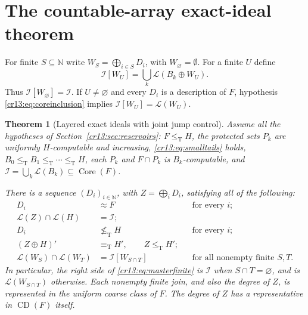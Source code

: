 \documentclass[11pt,letterpaper]{article}
\newtheorem{theorem}{Theorem}[section]
\theoremstyle{definition}
\theoremstyle{remark}\newtheorem{remark}[theorem]{Remark}
\numberwithin{equation}{section}
\newcommand{\N}{\mathbb N}
\newcommand{\leT}{\leq_{\mathrm T}}
\newcommand{\eqT}{\equiv_{\mathrm T}}
\newcommand{\nleT}{\nleq_{\mathrm T}}
\newcommand{\Low}{\mathcal L}
\newcommand{\Core}{\operatorname{Core}}
\newcommand{\CD}{\operatorname{CD}}
\newcommand{\Ideal}{\mathcal I}
\begin{document}
\section{The countable-array exact-ideal theorem}
\label{cr13:sec:master}
For finite $S\subseteq\N$ write $W_S=\bigoplus_{i\in S}D_i$, with $W_\varnothing=\emptyset$. For a finite $U$ define
\begin{equation}\label{cr13:eq:relativeideal}
                \Ideal[W_U]=\bigcup_k\Low(B_k\oplus W_U).
\end{equation}
Thus $\Ideal[W_\varnothing]=\Ideal$. If $U\ne\varnothing$ and every $D_i$ is a description of $F$, hypothesis \eqref{cr13:eq:coreinclusion} implies $\Ideal[W_U]=\Low(W_U)$.

\begin{theorem}[Layered exact ideals with joint jump control]\label{cr13:thm:master}
Assume all the hypotheses of Section~\ref{cr13:sec:reservoirs}: $F\leT H$, the protected sets $P_k$ are uniformly $H$-computable and increasing, \eqref{cr13:eq:smalltails} holds, $B_0\leT B_1\leT\cdots\leT H$, each $P_k$ and $F\cap P_k$ is $B_k$-computable, and $\Ideal=\bigcup_k\Low(B_k)\subseteq\Core(F)$.

There is a sequence $(D_i)_{i\in\N}$, with $Z=\bigoplus_iD_i$, satisfying all of the following:
\begin{align}
 D_i&\approx F &&\text{for every }i;\label{cr13:eq:masterdensity}\\
 \Low(Z)\cap\Low(H)&=\Ideal;\label{cr13:eq:masterfixed}\\
 D_i&\nleT H &&\text{for every }i;\label{cr13:eq:masternonH}\\
 (Z\oplus H)'&\eqT H',\qquad Z\leT H';\label{cr13:eq:masterjump}\\
 \Low(W_S)\cap\Low(W_T)&=\Ideal[W_{S\cap T}]
   &&\text{for all nonempty finite }S,T.\label{cr13:eq:masterfinite}
\end{align}
In particular, the right side of \eqref{cr13:eq:masterfinite} is $\Ideal$ when $S\cap T=\varnothing$, and is $\Low(W_{S\cap T})$ otherwise. Each nonempty finite join, and also the degree of $Z$, is represented in the uniform coarse class of $F$. The degree of $Z$ has a representative in $\CD(F)$ itself.
\end{theorem}
\end{document}
